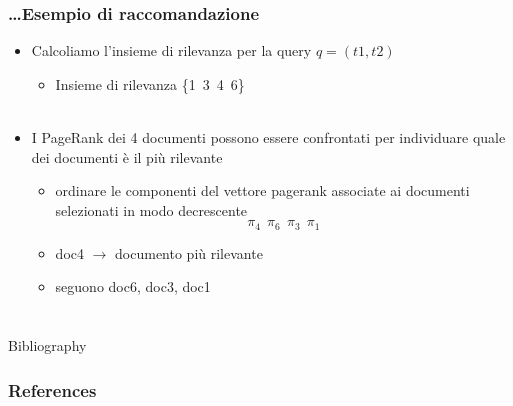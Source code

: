 \documentclass{beamer}
\begin{document}
\begin{frame}
	\frametitle{\dots Esempio di raccomandazione}
\begin{itemize}
\item Calcoliamo l'insieme di rilevanza per la query $q=(t1,t2)$
\begin{itemize}
	\item Insieme di rilevanza \{1~3~4~6\} \\~\\
\end{itemize}
\item I PageRank dei 4 documenti possono essere confrontati per individuare quale dei documenti è il più rilevante
\begin{itemize}
	\item ordinare le componenti del vettore pagerank associate ai documenti selezionati in modo decrescente
	$$\pi_4~~\pi_6~~\pi_3~~\pi_1$$
	\item doc4 $\longrightarrow$ documento più rilevante
	\item seguono doc6, doc3, doc1
\end{itemize}
\end{itemize}
\end{frame}
\section{}

\begin{frame}{Bibliography}
	\frametitle{References}
	
	
\end{frame}
\end{document}
